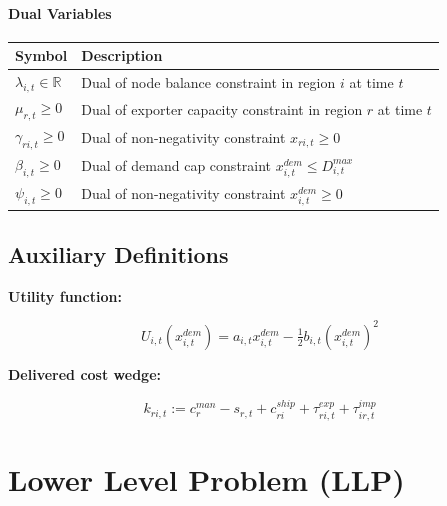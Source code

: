 \paragraph{Dual Variables}

\begin{flushleft}
\begin{tabular}{@{}lp{10cm}@{}}
\toprule
\textbf{Symbol} & \textbf{Description} \\
\midrule
$\lambda_{i,t} \in \mathbb{R}$ & Dual of node balance constraint in region $i$ at time $t$ \\
$\mu_{r,t} \ge 0$ & Dual of exporter capacity constraint in region $r$ at time $t$ \\
$\gamma_{ri,t} \ge 0$ & Dual of non-negativity constraint $x_{ri,t} \ge 0$ \\
$\beta_{i,t} \ge 0$ & Dual of demand cap constraint $x^{dem}_{i,t} \le D^{max}_{i,t}$ \\
$\psi_{i,t} \ge 0$ & Dual of non-negativity constraint $x^{dem}_{i,t} \ge 0$ \\
\bottomrule
\end{tabular}
\end{flushleft}

\subsection{Auxiliary Definitions}

\begin{flushleft}
\textbf{Utility function:}
\end{flushleft}
\begin{equation}
U_{i,t}(x^{dem}_{i,t}) = a_{i,t} x^{dem}_{i,t} - \tfrac{1}{2} b_{i,t} (x^{dem}_{i,t})^2
\end{equation}

\begin{flushleft}
\textbf{Delivered cost wedge:}
\end{flushleft}
\begin{equation}
k_{ri,t} := c^{man}_r - s_{r,t} + c^{ship}_{ri} + \tau^{exp}_{ri,t} + \tau^{imp}_{ir,t}
\end{equation}

\section{Lower Level Problem (LLP)}

